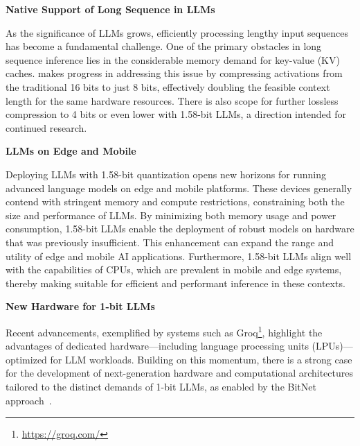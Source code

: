 \textbf{Native Support of Long Sequence in LLMs}

As the significance of LLMs grows, efficiently processing lengthy input sequences has become a fundamental challenge. One of the primary obstacles in long sequence inference lies in the considerable memory demand for key-value (KV) caches.  makes progress in addressing this issue by compressing activations from the traditional 16 bits to just 8 bits, effectively doubling the feasible context length for the same hardware resources. There is also scope for further lossless compression to 4 bits or even lower with 1.58-bit LLMs, a direction intended for continued research.

\textbf{LLMs on Edge and Mobile}

Deploying LLMs with 1.58-bit quantization opens new horizons for running advanced language models on edge and mobile platforms. These devices generally contend with stringent memory and compute restrictions, constraining both the size and performance of LLMs. By minimizing both memory usage and power consumption, 1.58-bit LLMs enable the deployment of robust models on hardware that was previously insufficient. This enhancement can expand the range and utility of edge and mobile AI applications. Furthermore, 1.58-bit LLMs align well with the capabilities of CPUs, which are prevalent in mobile and edge systems, thereby making  suitable for efficient and performant inference in these contexts.

\textbf{New Hardware for 1-bit LLMs}

Recent advancements, exemplified by systems such as Groq\footnote{\url{https://groq.com/}}, highlight the advantages of dedicated hardware—including language processing units (LPUs)—optimized for LLM workloads. Building on this momentum, there is a strong case for the development of next-generation hardware and computational architectures tailored to the distinct demands of 1-bit LLMs, as enabled by the BitNet approach~\cite{bitnet}.

